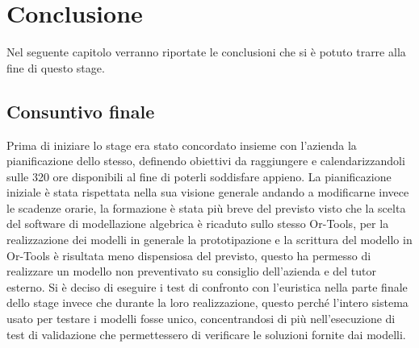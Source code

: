 
\hypertarget{(chap:capitolo8)}{}
\chapter{Conclusione}
Nel seguente capitolo verranno riportate le conclusioni che si è potuto trarre alla fine di questo stage.
\section{Consuntivo finale}
Prima di iniziare lo stage era stato concordato insieme con l'azienda la pianificazione dello stesso, definendo obiettivi da raggiungere e calendarizzandoli sulle 320 ore disponibili al fine di poterli soddisfare appieno. La pianificazione iniziale è stata rispettata nella sua visione generale andando a modificarne invece le scadenze orarie, la formazione è stata più breve del previsto visto che la scelta del software di modellazione algebrica è ricaduto sullo stesso Or-Tools, per la realizzazione dei modelli in generale la prototipazione e la scrittura del modello in Or-Tools è risultata meno dispensiosa del previsto, questo ha permesso di realizzare un modello non preventivato su consiglio dell'azienda e del tutor esterno.
Si è deciso di eseguire i test di confronto con l'euristica nella parte finale dello stage invece che durante la loro realizzazione, questo perché l'intero sistema usato per testare i modelli fosse unico, concentrandosi di più nell'esecuzione di test di validazione che permettessero di verificare le soluzioni fornite dai modelli.

